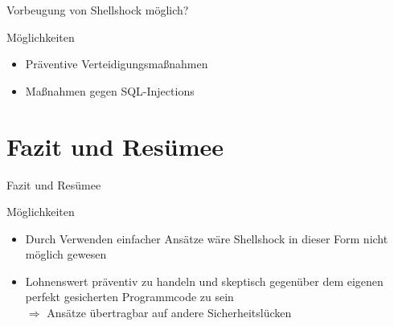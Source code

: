 \documentclass[handout]{beamer}
\begin{document}
\begin{frame}{Vorbeugung von Shellshock möglich?}
\begin{block}{Möglichkeiten}
\begin{itemize}[<+->]
\item Präventive Verteidigungsmaßnahmen
\item Maßnahmen gegen SQL-Injections
\end{itemize}
\end{block}
\end{frame}





\section[Fazit]{Fazit und Resümee}
\begin{frame}{Fazit und Resümee}
\begin{block}{Möglichkeiten}
\begin{itemize}[<+->]
\item Durch Verwenden einfacher Ansätze wäre Shellshock in dieser Form nicht möglich gewesen
\item Lohnenswert präventiv zu handeln und skeptisch gegenüber dem eigenen perfekt gesicherten Programmcode zu sein \\
$\Rightarrow$ Ansätze übertragbar auf andere Sicherheitslücken
\end{itemize}
\end{block}
\end{frame}
\end{document}
